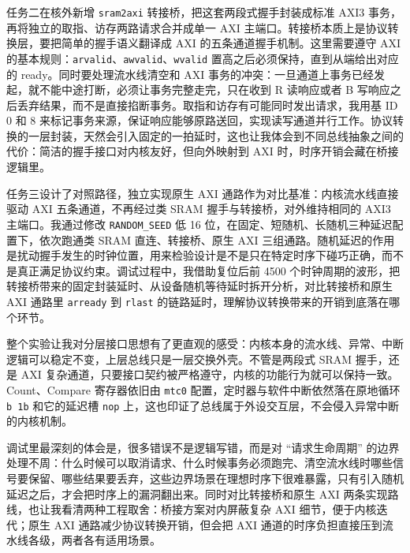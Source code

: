 \documentclass{article}
\begin{document}
任务二在核外新增 \texttt {sram2axi} 转接桥，把这套两段式握手封装成标准 AXI3 事务，再将独立的取指、访存两路请求合并成单一 AXI 主端口。转接桥本质上是协议转换层，要把简单的握手语义翻译成 AXI 的五条通道握手机制。这里需要遵守 AXI 的基本规则：\texttt {arvalid}、\texttt {awvalid}、\texttt {wvalid} 置高之后必须保持，直到从端给出对应的 ready。同时要处理流水线清空和 AXI 事务的冲突：一旦通道上事务已经发起，就不能中途打断，必须让事务完整走完，只在收到 R 读响应或者 B 写响应之后丢弃结果，而不是直接掐断事务。取指和访存有可能同时发出请求，我用基 ID 0 和 8 来标记事务来源，保证响应能够原路送回，实现读写通道并行工作。协议转换的一层封装，天然会引入固定的一拍延时，这也让我体会到不同总线抽象之间的代价：简洁的握手接口对内核友好，但向外映射到 AXI 时，时序开销会藏在桥接逻辑里。

任务三设计了对照路径，独立实现原生 AXI 通路作为对比基准：内核流水线直接驱动 AXI 五条通道，不再经过类 SRAM 握手与转接桥，对外维持相同的 AXI3 主端口。我通过修改 \texttt {RANDOM\_SEED} 低 16 位，在固定、短随机、长随机三种延迟配置下，依次跑通类 SRAM 直连、转接桥、原生 AXI 三组通路。随机延迟的作用是扰动握手发生的时钟位置，用来检验设计是不是只在特定时序下碰巧正确，而不是真正满足协议约束。调试过程中，我借助复位后前 4500 个时钟周期的波形，把转接桥带来的固定封装延时、从设备随机等待延时拆开分析，对比转接桥和原生 AXI 通路里 \texttt {arready} 到 \texttt {rlast} 的链路延时，理解协议转换带来的开销到底落在哪个环节。

整个实验让我对分层接口思想有了更直观的感受：内核本身的流水线、异常、中断逻辑可以稳定不变，上层总线只是一层交换外壳。不管是两段式 SRAM 握手，还是 AXI 复杂通道，只要接口契约被严格遵守，内核的功能行为就可以保持一致。Count、Compare 寄存器依旧由 \texttt {mtc0} 配置，定时器与软件中断依然落在原地循环 \texttt {b 1b} 和它的延迟槽 \texttt {nop} 上，这也印证了总线属于外设交互层，不会侵入异常中断的内核机制。

调试里最深刻的体会是，很多错误不是逻辑写错，而是对 “请求生命周期” 的边界处理不周：什么时候可以取消请求、什么时候事务必须跑完、清空流水线时哪些信号要保留、哪些结果要丢弃，这些边界场景在理想时序下很难暴露，只有引入随机延迟之后，才会把时序上的漏洞翻出来。同时对比转接桥和原生 AXI 两条实现路线，也让我看清两种工程取舍：桥接方案对内屏蔽复杂 AXI 细节，便于内核迭代；原生 AXI 通路减少协议转换开销，但会把 AXI 通道的时序负担直接压到流水线各级，两者各有适用场景。
\end{document}
